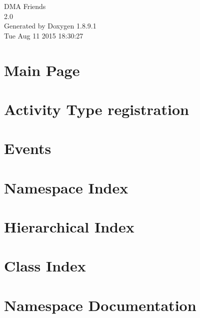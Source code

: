 \documentclass[twoside]{book}
\newcommand{\+}{\discretionary{\mbox{\scriptsize$\hookleftarrow$}}{}{}}
\newcommand{\clearemptydoublepage}{%
  \newpage{\pagestyle{empty}\cleardoublepage}%
}
\begin{document}
\hypersetup{pageanchor=false,
             bookmarks=true,
             bookmarksnumbered=true,
             pdfencoding=unicode
            }
\begin{titlepage}
\vspace*{7cm}
\begin{center}%
{\Large D\+M\+A Friends \\[1ex]\large 2.\+0 }\\
\vspace*{1cm}
{\large Generated by Doxygen 1.8.9.1}\\
\vspace*{0.5cm}
{\small Tue Aug 11 2015 18:30:27}\\
\end{center}
\end{titlepage}
\clearemptydoublepage
\tableofcontents
\clearemptydoublepage
{}
\hypersetup{pageanchor=true}

\chapter{Main Page}
\label{index}\hypertarget{index}{}
\chapter{Activity Type registration}
\label{df/d06/md_docs_ACTIVITY-TYPES}
\hypertarget{df/d06/md_docs_ACTIVITY-TYPES}{}

\chapter{Events}
\label{df/d0e/md_docs_EVENTS}
\hypertarget{df/d0e/md_docs_EVENTS}{}

\chapter{Namespace Index}

\chapter{Hierarchical Index}

\chapter{Class Index}

\chapter{Namespace Documentation}




\end{document}
